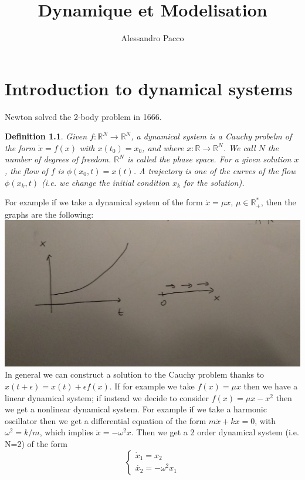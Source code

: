 \documentclass[10pt,a4paper]{book}
\author{Alessandro Pacco}
\title{Dynamique et Modelisation}
\newtheorem{definition}{Definition}
\begin{document}
\maketitle


\tableofcontents

\chapter{Introduction to dynamical systems}

Newton solved the 2-body problem in 1666. 

\begin{definition} Given $f:\mathbb{R}^N\to\mathbb{R}^N$, a dynamical system is a Cauchy probelm of the form 
$\dot{x}=f(x)$  with $x(t_0)=x_0$, and where $x:\mathbb{R}\to\mathbb{R}^N$. We call $N$ the number of degrees of freedom.  $\mathbb{R}^N$ is called the phase space. For a given solution $x$, the flow of $f$ is $\phi(x_0,t)=x(t)$. A trajectory is one of the curves of the flow $\phi(x_k,t)$ (i.e. we change the initial condition $x_k$ for the solution).
\end{definition}
For example if we take a dynamical system of the form $\dot{x}=\mu x$, $\mu\in\mathbb{R}_+^*$, then the graphs are the following:\\
\includegraphics[scale=0.2]{fig1}\\
In general we can construct a solution to the Cauchy problem thanks to $x(t+\epsilon)=x(t)+\epsilon f(x)$. If for example we take $f(x)=\mu x$ then we have a linear dynamical system; if instead we decide to consider $f(x)=\mu x-x^2$ then we get a nonlinear dynamical system. For example if we take a harmonic oscillator then we get a differential  equation of the form
$m\ddot{x}+kx=0$, with $\omega^2=k/m$, which implies $\ddot{x}=-\omega^2 x$. Then we get a 2 order dynamical system (i.e. N=2) of the form
$$\begin{cases}
\dot{x}_1=x_2\\
\dot{x_2}=-\omega^2x_1
\end{cases}$$
\end{document}
